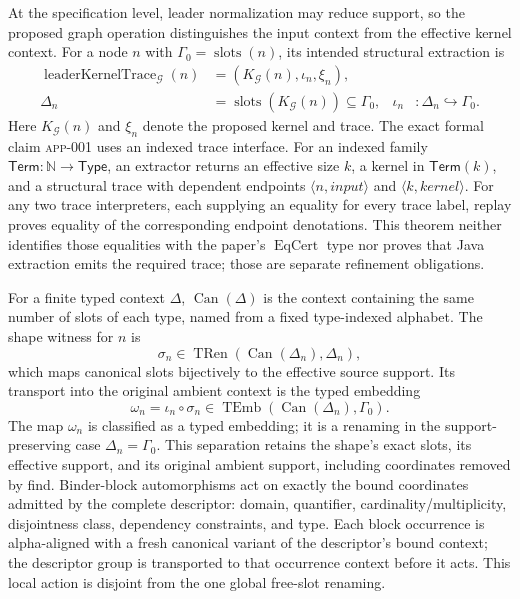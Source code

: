 At the specification level, leader normalization may reduce support, so the
proposed graph operation distinguishes the input context from the effective
kernel context.  For a node $n$ with
$\Gamma_0=\operatorname{slots}(n)$, its intended structural extraction is
\begin{align*}
\operatorname{leaderKernelTrace}_{\mathcal G}(n)
  &=(K_{\mathcal G}(n),\iota_n,\xi_n),\\
\Delta_n&=\operatorname{slots}(K_{\mathcal G}(n))\subseteq\Gamma_0,
&\iota_n&:\Delta_n\hookrightarrow\Gamma_0.
\end{align*}
Here $K_{\mathcal G}(n)$ and $\xi_n$ denote the proposed kernel and trace.
The exact formal claim \textsc{app-001} uses an indexed trace interface.  For an
indexed family $\mathsf{Term}:\mathbb N\to\mathsf{Type}$, an extractor returns
an effective size $k$, a kernel in $\mathsf{Term}(k)$, and a structural trace
with dependent endpoints
$\langle n,\mathit{input}\rangle$ and $\langle k,\mathit{kernel}\rangle$.
For any two trace interpreters, each supplying an equality for every trace
label, replay proves equality of the corresponding endpoint
denotations.  This theorem neither identifies those equalities with the
paper's $\operatorname{EqCert}$ type nor proves that Java extraction emits the
required trace; those are separate refinement obligations.

For a finite typed context $\Delta$, $\operatorname{Can}(\Delta)$ is the
context containing the same number of
slots of each type, named from a fixed type-indexed alphabet.  The shape
witness for $n$ is
\[
  \sigma_n\in\operatorname{TRen}(\operatorname{Can}(\Delta_n),\Delta_n),
\]
which maps canonical slots bijectively to the effective source support.  Its
transport into the original ambient context is the typed embedding
\[
  \omega_n=\iota_n\circ\sigma_n
  \in\operatorname{TEmb}(\operatorname{Can}(\Delta_n),\Gamma_0).
\]
The map $\omega_n$ is classified as a typed embedding; it is a renaming in the
support-preserving case $\Delta_n=\Gamma_0$.  This separation retains the
shape's exact slots, its effective support, and its original ambient support,
including coordinates removed by find.  Binder-block automorphisms act on
exactly the bound coordinates admitted by the complete
descriptor: domain, quantifier, cardinality/multiplicity, disjointness class,
dependency constraints, and type.  Each block occurrence is alpha-aligned with
a fresh canonical variant of the descriptor's bound context; the descriptor
group is transported to that occurrence context before it acts.  This local
action is disjoint from the one global free-slot renaming.

